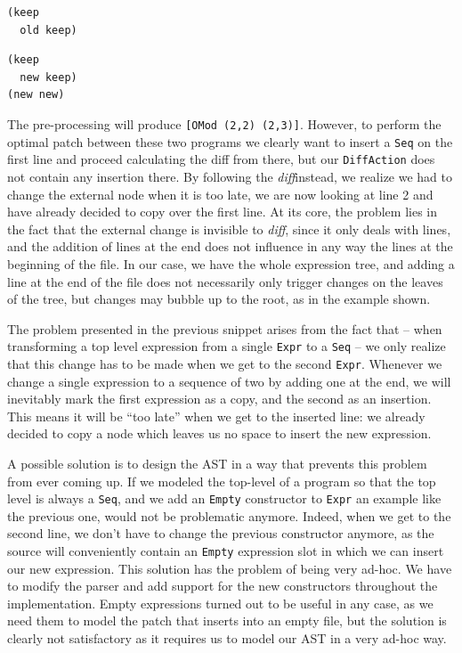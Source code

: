 \documentclass[11pt, titlepage]{article}
\newcommand{\toHaskell}[1]{\texttt{#1}\xspace}
\newcommand{\diff}{\emph{diff}}
\begin{document}
\vspace{.6em}
\begin{minipage}[t]{0.45\textwidth}
\begin{verbatim}
(keep
  old keep)
\end{verbatim}
\end{minipage}
\begin{minipage}{0.45\textwidth}
\begin{verbatim}
(keep
  new keep)
(new new)
\end{verbatim}
\end{minipage}
\vspace{.6em}

The pre-processing will produce \toHaskell{[OMod (2,2) (2,3)]}. 
However, to perform the optimal patch between these two programs we clearly want to insert a \texttt{Seq} on the first line and proceed calculating the diff from there, but our \toHaskell{DiffAction} does not contain any insertion there. 
By following the \diff instead, we realize we had to change the external node when it is too late, we are now looking at line 2 and have already decided to copy over the first line. 
At its core, the problem lies in the fact that the external change is invisible to \diff, since it only deals with lines, and the addition of lines at the end does not influence in any way the lines at the beginning of the file. 
In our case, we have the whole expression tree, and adding a line at the end of the file does not necessarily only trigger changes on the leaves of the tree, but changes may bubble up to the root, as in the example shown. 

The problem presented in the previous snippet arises from the fact that -- when transforming a top level expression from a single \toHaskell{Expr} to a \toHaskell{Seq} -- we only realize that this change has to be made when we get to the second \toHaskell{Expr}. 
Whenever we change a single expression to a sequence of two by adding one at the end, we will inevitably mark the first expression as a copy, and the second as an insertion. This means it will be ``too late'' when we get to the inserted line: we already decided to copy a node which leaves us no space to insert the new expression.

A possible solution is to design the AST in a way that prevents this problem from ever coming up. If we modeled the top-level of a program so that the top level is always a \toHaskell{Seq}, and we add an \toHaskell{Empty} constructor to \toHaskell{Expr} an example like the previous one, would not be problematic anymore. 
Indeed, when we get to the second line, we don't have to change the previous constructor anymore, as the source will conveniently contain an \toHaskell{Empty} expression slot in which we can insert our new expression.
This solution has the problem of being very ad-hoc. We have to modify the parser and add support for the new constructors throughout the implementation. Empty expressions turned out to be useful in any case, as we need them to model the patch that inserts into an empty file, but the solution is clearly not satisfactory as it requires us to model our AST in a very ad-hoc way.
\end{document}
